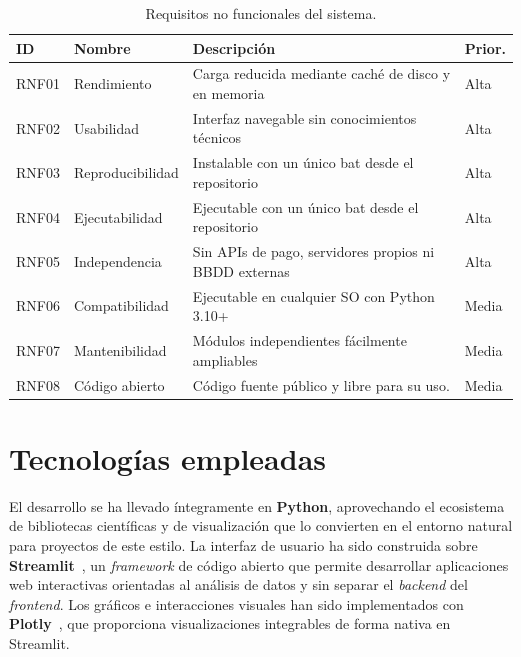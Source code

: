 \documentclass[12pt,a4paper,twoside,openright]{book}
\begin{document}
\begin{table}[ht]
  \centering
  \caption{Requisitos no funcionales del sistema.}
  \label{tab:rnf}
  \small
  \begin{tabularx}{\textwidth}{l l X l}
    \toprule
    \textbf{ID} & \textbf{Nombre} & \textbf{Descripción} & \textbf{Prior.} \\
    \midrule
    RNF01 & Rendimiento   & Carga reducida mediante caché de disco y en memoria & Alta \\
    \hline
    RNF02 & Usabilidad    & Interfaz navegable sin conocimientos técnicos & Alta \\
    \hline
    RNF03 & Reproducibilidad & Instalable con un único bat desde el repositorio & Alta \\
    \hline
    RNF04 & Ejecutabilidad & Ejecutable con un único bat desde el repositorio & Alta \\
    \hline
    RNF05 & Independencia & Sin APIs de pago, servidores propios ni BBDD externas & Alta \\
    \hline
    RNF06 & Compatibilidad & Ejecutable en cualquier SO con Python 3.10+ & Media \\
    \hline
    RNF07 & Mantenibilidad & Módulos independientes fácilmente ampliables & Media \\
    \hline
    RNF08 & Código abierto & Código fuente público y libre para su uso. & Media \\
    \bottomrule
  \end{tabularx}
\end{table}

\section{Tecnologías empleadas}
El desarrollo se ha llevado íntegramente en \textbf{Python}, aprovechando el ecosistema de bibliotecas científicas y de visualización que lo convierten en el entorno natural para proyectos de este estilo. La interfaz de usuario ha sido construida sobre \textbf{Streamlit}~\cite{streamlit}, un \textit{framework} de código abierto que permite desarrollar aplicaciones web interactivas orientadas al análisis de datos y sin separar el \textit{backend} del \textit{frontend}. Los gráficos e interacciones visuales han sido implementados con \textbf{Plotly}~\cite{plotly}, que proporciona visualizaciones integrables de forma nativa en Streamlit.
\end{document}
